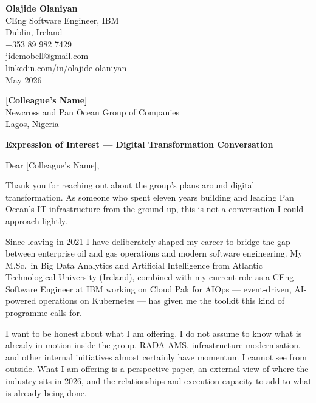 \documentclass[10pt]{article}
\newcommand{\spacer}{\vspace{10pt}}
\newcommand{\bigspacer}{\vspace{16pt}}
\begin{document}
\begin{flushright}
  {\small
  \textbf{Olajide Olaniyan}\\
  CEng Software Engineer, IBM\\
  Dublin, Ireland\\[2pt]
  +353 89 982 7429\\
  \href{mailto:jidemobell@gmail.com}{jidemobell@gmail.com}\\
  \href{https://linkedin.com/in/olajide-olaniyan}{linkedin.com/in/olajide-olaniyan}\\[4pt]
  {\color{darkgrey}May 2026}
  }
\end{flushright}

\spacer

{\small
\textbf{[Colleague's Name]}\\
Newcross and Pan Ocean Group of Companies\\
Lagos, Nigeria
}

\bigspacer

\begin{center}
  {\color{primary}\large\bfseries Expression of Interest ---
  Digital Transformation Conversation}
\end{center}

\spacer

Dear [Colleague's Name],

Thank you for reaching out about the group's plans around digital
transformation. As someone who spent eleven years building and leading Pan
Ocean's IT infrastructure from the ground up, this is not a conversation
I could approach lightly.

Since leaving in 2021 I have deliberately shaped my career to bridge the
gap between enterprise oil and gas operations and modern software
engineering. My M.Sc.\ in Big Data Analytics and Artificial Intelligence
from Atlantic Technological University (Ireland), combined with my current
role as a CEng Software Engineer at IBM working on Cloud Pak for AIOps ---
event-driven, AI-powered operations on Kubernetes --- has given me the
toolkit this kind of programme calls for.

I want to be honest about what I am offering. I do not assume to know what
is already in motion inside the group. RADA-AMS, infrastructure
modernisation, and other internal initiatives almost certainly have
momentum I cannot see from outside. What I am offering is a perspective
paper, an external view of where the industry sits in 2026, and the
relationships and execution capacity to add to what is already being done.
\end{document}
